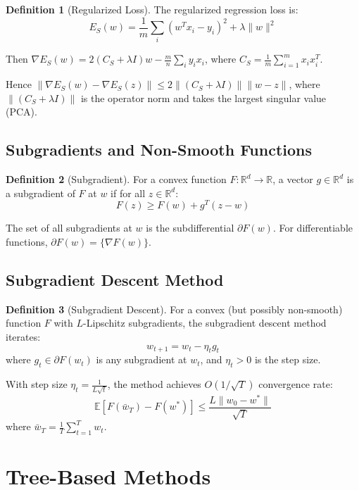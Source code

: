 \documentclass[12pt,a4paper]{article}
\theoremstyle{definition}
\newtheorem{definition}{Definition}[section]
\begin{document}
\begin{definition}[Regularized Loss]
The regularized regression loss is:
\[
E_S(w) = \frac{1}{m} \sum_{i} (w^T x_i - y_i)^2 + \lambda \|w\|^2
\]

Then $\nabla E_S(w) = 2(C_S + \lambda I)w - \frac{m}{n} \sum_i y_i x_i$, where $C_S = \frac{1}{m}\sum_{i=1}^m x_i x_i^T$.

Hence $\|\nabla E_S(w) - \nabla E_S(z)\| \leq 2 \|(C_S + \lambda I)\| \|w - z\|$, where $\|(C_S + \lambda I)\|$ is the operator norm and takes the largest singular value (PCA).
\end{definition}

\subsection{Subgradients and Non-Smooth Functions}

\begin{definition}[Subgradient]
For a convex function $F: \mathbb{R}^d \to \mathbb{R}$, a vector $g \in \mathbb{R}^d$ is a subgradient of $F$ at $w$ if for all $z \in \mathbb{R}^d$:
\[
F(z) \geq F(w) + g^T(z - w)
\]

The set of all subgradients at $w$ is the subdifferential $\partial F(w)$. For differentiable functions, $\partial F(w) = \{\nabla F(w)\}$.
\end{definition}

\subsection{Subgradient Descent Method}

\begin{definition}[Subgradient Descent]
For a convex (but possibly non-smooth) function $F$ with $L$-Lipschitz subgradients, the subgradient descent method iterates:
\[
w_{t+1} = w_t - \eta_t g_t
\]
where $g_t \in \partial F(w_t)$ is any subgradient at $w_t$, and $\eta_t > 0$ is the step size.

With step size $\eta_t = \frac{1}{L\sqrt{t}}$, the method achieves $O(1/\sqrt{T})$ convergence rate:
\[
\mathbb{E}[F(\bar{w}_T) - F(w^*)] \leq \frac{L\|w_0 - w^*\|}{\sqrt{T}}
\]
where $\bar{w}_T = \frac{1}{T}\sum_{t=1}^T w_t$.
\end{definition}

\section{Tree-Based Methods}
\end{document}
